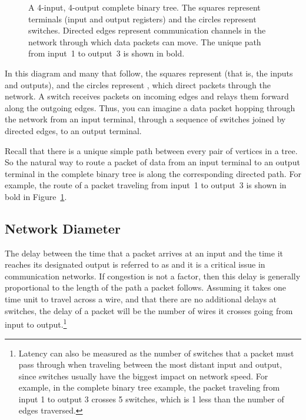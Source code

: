 \begin{figure}

\missinggraphic

\caption{A 4-input, 4-output complete binary tree.  The squares
  represent terminals (input and output registers) and the circles
  represent switches.  Directed edges represent communication channels
  in the network through which data packets can move.  The unique path
  from input~1 to output~3 is shown in bold.}

\label{fig:6EH}

\end{figure}

In this diagram and many that follow, the squares represent
 (that is, the inputs and outputs), and the circles
represent , which direct packets through the network.
A switch receives packets on incoming edges and relays them forward
along the outgoing edges.  Thus, you can imagine a data packet hopping
through the network from an input terminal, through a sequence of
switches joined by directed edges, to an output terminal.

Recall that there is a unique simple path between every pair of
vertices in a tree.  So the natural way to route a packet of data from
an input terminal to an output terminal in the complete binary tree is
along the corresponding directed path.  For example, the route of a
packet traveling from input~1 to output~3 is shown in bold in
Figure~\ref{fig:6EH}.

\subsection{Network Diameter}

The delay between the time that a packet arrives at an input and the
time it reaches its designated output is referred to as 
and it is a critical issue in communication networks.  If congestion
is not a factor, then this delay is generally proportional to the
length of the path a packet follows.  Assuming it takes one time unit
to travel across a wire, and that there are no additional delays at
switches, the delay of a packet will be the number of wires it crosses
going from input to output.\footnote{Latency can also be measured as
  the number of switches that a packet must pass through when
  traveling between the most distant input and output, since switches
  usually have the biggest impact on network speed.  For example, in
  the complete binary tree example, the packet traveling from input 1
  to output 3 crosses 5 switches, which is 1 less than the number of
  edges traversed.}

